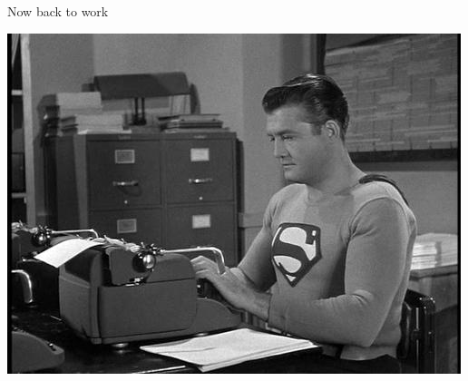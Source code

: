 \documentclass[dvipsnames]{beamer}
\begin{document}
\begin{frame}{Now back to work}

\begin{center}\includegraphics[scale=0.7]{superman-coding.jpg}\end{center}

\end{frame}
\end{document}
